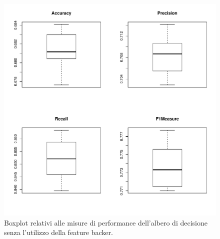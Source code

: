 \begin{figure}[h!]
	\centering
	\includegraphics[width=0.7\linewidth]{../FinalResults/TreeNB_performance}
	\caption{Boxplot relativi alle misure di performance dell'albero di decisione senza l'utilizzo della feature backer.}
	\label{fig:treenbperformance}
\end{figure}
